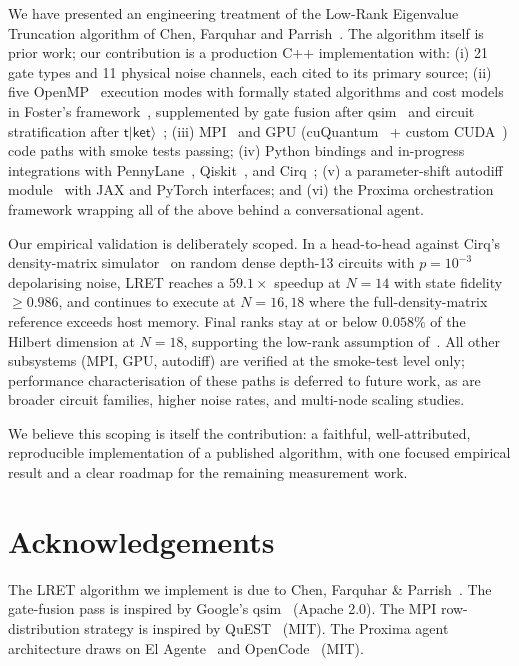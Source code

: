 \documentclass[11pt,a4paper]{article}
\begin{document}
We have presented an engineering treatment of the Low-Rank Eigenvalue Truncation
algorithm of Chen, Farquhar and Parrish~\cite{chen2021lret}. The algorithm itself is
prior work; our contribution is a production C++ implementation with:
(i) 21 gate types and 11 physical noise channels, each cited to its primary source;
(ii) five OpenMP~\cite{dagummenon1998} execution modes with formally stated
algorithms and cost models in Foster's framework~\cite{foster1995}, supplemented by
gate fusion after qsim~\cite{qsim} and circuit stratification after
$\mathsf{t\vert ket\rangle}$~\cite{sivarajah2020tket};
(iii) MPI~\cite{gropp1999mpi} and GPU (cuQuantum~\cite{bayraktar2023cuquantum} +
custom CUDA~\cite{nickolls2008cuda}) code paths with smoke tests passing;
(iv) Python bindings and in-progress integrations with
PennyLane~\cite{bergholm2018pennylane}, Qiskit~\cite{javadi2024qiskit}, and
Cirq~\cite{cirq};
(v) a parameter-shift autodiff module~\cite{mitarai2018,schuld2019} with JAX and
PyTorch interfaces; and
(vi) the Proxima orchestration framework wrapping all of the above behind a
conversational agent.

Our empirical validation is deliberately scoped. In a head-to-head against Cirq's
density-matrix simulator~\cite{cirq} on random dense depth-13 circuits with
$p=10^{-3}$ depolarising noise, LRET reaches a $59.1\times$ speedup at $N=14$ with
state fidelity $\ge 0.986$, and continues to execute at $N=16, 18$ where the
full-density-matrix reference exceeds host memory. Final ranks stay at or below
$0.058\%$ of the Hilbert dimension at $N=18$, supporting the low-rank assumption
of~\cite{chen2021lret}. All other subsystems (MPI, GPU, autodiff) are verified
at the smoke-test level only; performance characterisation of these paths is
deferred to future work, as are broader circuit families, higher noise rates, and
multi-node scaling studies.

We believe this scoping is itself the contribution: a faithful, well-attributed,
reproducible implementation of a published algorithm, with one focused empirical
result and a clear roadmap for the remaining measurement work.

\section*{Acknowledgements}

The LRET algorithm we implement is due to Chen, Farquhar \& Parrish~\cite{chen2021lret}.
The gate-fusion pass is inspired by Google's qsim~\cite{qsim} (Apache 2.0).
The MPI row-distribution strategy is inspired by QuEST~\cite{jones2019quest} (MIT).
The Proxima agent architecture draws on El Agente~\cite{zou2025elagente} and
OpenCode~\cite{opencode2025} (MIT).
\end{document}
